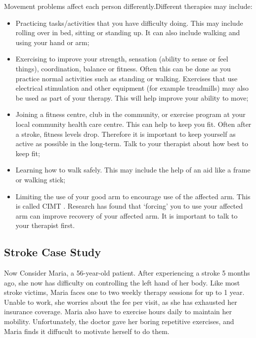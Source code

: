 Movement problems affect each person differently.Different therapies may include:
\begin{itemize}
\item Practicing tasks/activities that you have difficulty doing. This may include rolling over in bed, sitting or standing up. It can also include walking and using your hand or arm;

\item Exercising to improve your strength, sensation (ability to sense or feel things), coordination, balance or fitness. Often this can be done as you practice normal activities such as standing or walking. Exercises that use electrical stimulation and other equipment (for example treadmills) may also be used as part of your therapy. This will help improve your ability to move;

\item Joining a fitness centre, club in the community, or exercise program at your local community health care centre. This can help to keep you fit. Often after a stroke, fitness levels drop. Therefore it is important to keep yourself as active as possible in the long-term. Talk to your therapist about how best to keep fit;

\item Learning how to walk safely. This may include the help of an aid like a frame or walking stick;

\item Limiting the use of your good arm to encourage use of the affected arm. This is called CIMT \cite{constrain}. Research has found that ‘forcing’ you to use your affected arm can improve recovery of your affected arm. It is important to talk to your therapist first.
\end{itemize}





\subsection{Stroke Case Study}
Now Consider Maria, a 56-year-old patient. After experiencing a stroke 5 months ago, she now has difficulty on controlling the left hand of her body. Like most stroke victims, Maria faces one to two weekly therapy sessions for up to 1 year. Unable to work, she worries about the fee per visit, as she has exhausted her insurance coverage. Maria also have to exercise hours daily to maintain her mobility. Unfortunately, the doctor gave her boring repetitive exercises, and Maria finds it diffucult to motivate herself to do them.

